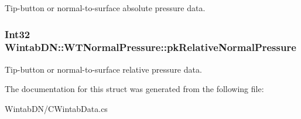 Tip-\/button or normal-\/to-\/surface absolute pressure data. 

\hypertarget{struct_wintab_d_n_1_1_w_t_normal_pressure_af0352f6fd2b6c25b19ce82083f698436}{
\subsubsection[{pkRelativeNormalPressure}]{\setlength{\rightskip}{0pt plus 5cm}Int32 {\bf WintabDN::WTNormalPressure::pkRelativeNormalPressure}}}
\label{struct_wintab_d_n_1_1_w_t_normal_pressure_af0352f6fd2b6c25b19ce82083f698436}


Tip-\/button or normal-\/to-\/surface relative pressure data. 



The documentation for this struct was generated from the following file:\begin{DoxyCompactItemize}
\item 
WintabDN/CWintabData.cs\end{DoxyCompactItemize}
